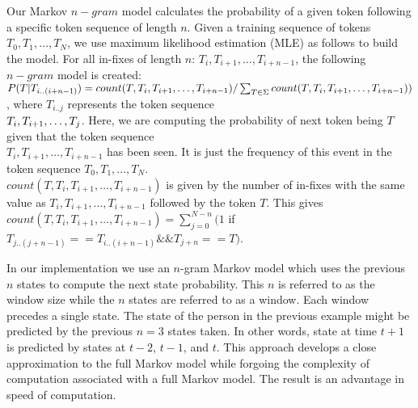 
Our Markov $n-gram$ model calculates the probability of a given token following a specific 
token sequence of length $n$.
Given a training sequence of tokens $T_0, T_1, \dots , T_N$,
we use maximum likelihood estimation (MLE) as follows to build the model.
%
For all in-fixes of
length $n$: $T_i, T_{i+1}, \dots , T_{i+n-1}$,
the following $n-gram$ model is created:
$P(T | T_{i..(i+n-1)}) =  count(T, T_i, T_{i+1}, \dots , T_{i+n-1})/\sum_{T \in \Sigma} count(
T, T_i, T_{i+1}, \dots , \\T_{i+n-1}))$, where $T_{i..j}$ represents the
token sequence \\
$T_i, T_{i+\\1}, \dots, T_j$.
Here, we are computing the probability of next token being $T$
given that the token sequence \\
$T_i, T_{i+1}, \dots , T_{i+n-1}$ has been seen.
It is just the
frequency of this event in the token sequence $T_0, T_1, \dots , T_N$. \\
$count(T, T_i, T_{i+1}, \dots , T_{i+n-1})$ is given by the number of in-fixes with the same value as
$T_i, T_{i+1}, \dots , T_{i+n-1}$ followed by the token $T$. This gives 
$count(T, T_i, T_{i+1}, \dots , T_{i+n-1}) = \sum_{j=0}^{N-n}(1$ if $T_{j..(j+n-1)} == T_{i..(i+n-1)} \&\&
T_{j+n} == T)$.

In our implementation we use an
$n$-gram Markov model which uses the
previous $n$ states to compute the
next state probability.
%
This $n$ is referred to as the window size
while the $n$ states are
referred to as a window.
Each window precedes a single state.
%
The state of the person in the
previous example might be predicted by
the previous $n = 3$ states taken.
In other words,
state at time $t+1$ is predicted by
states at $t-2$, $t-1$, and $t$.
%
This approach develops a close approximation
to the full Markov model while
forgoing the complexity of computation
associated with 
a full Markov model.
The result is an advantage in 
speed of computation.

